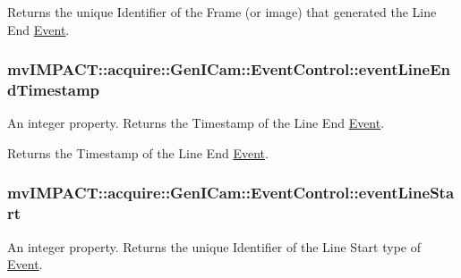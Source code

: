 Returns the unique Identifier of the Frame (or image) that generated the Line End \hyperlink{classmv_i_m_p_a_c_t_1_1acquire_1_1_event}{Event}. \hypertarget{classmv_i_m_p_a_c_t_1_1acquire_1_1_gen_i_cam_1_1_event_control_a513f0e4e25a80a0576a1334c139f758b}{
\subsubsection[{event\+Line\+End\+Timestamp}]{ mv\+I\+M\+P\+A\+C\+T\+::acquire\+::\+Gen\+I\+Cam\+::\+Event\+Control\+::event\+Line\+End\+Timestamp}}\label{classmv_i_m_p_a_c_t_1_1acquire_1_1_gen_i_cam_1_1_event_control_a513f0e4e25a80a0576a1334c139f758b}


An integer property. Returns the Timestamp of the Line End \hyperlink{classmv_i_m_p_a_c_t_1_1acquire_1_1_event}{Event}. 

Returns the Timestamp of the Line End \hyperlink{classmv_i_m_p_a_c_t_1_1acquire_1_1_event}{Event}. \hypertarget{classmv_i_m_p_a_c_t_1_1acquire_1_1_gen_i_cam_1_1_event_control_ac292ef609ac6d98f02b2b264293bdbc7}{
\subsubsection[{event\+Line\+Start}]{ mv\+I\+M\+P\+A\+C\+T\+::acquire\+::\+Gen\+I\+Cam\+::\+Event\+Control\+::event\+Line\+Start}}\label{classmv_i_m_p_a_c_t_1_1acquire_1_1_gen_i_cam_1_1_event_control_ac292ef609ac6d98f02b2b264293bdbc7}


An integer property. Returns the unique Identifier of the Line Start type of \hyperlink{classmv_i_m_p_a_c_t_1_1acquire_1_1_event}{Event}. 


